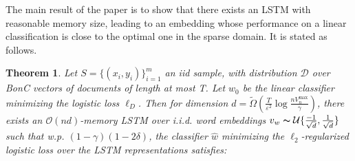 \documentclass{article}
\newtheorem{theorem}{Theorem}[section]
\begin{document}
The main result of the paper is to show that there exists an LSTM with reasonable memory size, leading to an embedding whose performance on a linear classification is close to the optimal one in the sparse domain. It is stated as follows. \\

\begin{theorem}
Let $S = \{(x_i, y_i)\}_{i=1}^m$ an iid sample, with distribution $\mathcal{D}$ over BonC vectors of documents of length at most T. Let $w_0$ be the linear classifier minimizing the logistic loss $\ell_{D}$. Then for dimension $d = \tilde{\Omega}\left(\frac{T}{\varepsilon^2} \log \frac{n V_n^{\max}}{\gamma}\right)$, there exists an $\mathcal{O}(nd)$-memory LSTM over i.i.d. word embeddings $v_w \thicksim \mathcal{U}\{\frac{-1}{\sqrt{d}}, \frac{1}{\sqrt{d}}\}$ such that w.p. $(1-\gamma)(1 - 2\delta)$, the classifier $\widehat{w}$ minimizing the $\ell_2$-regularized logistic loss over the LSTM representations satisfies: 
\end{theorem} 
\end{document}
